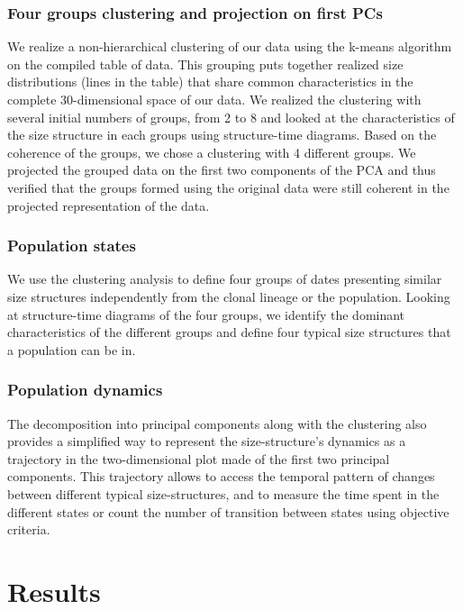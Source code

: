 \subsubsection{Four groups clustering and projection on first PCs}

We realize a non-hierarchical clustering of our data using the
k-means algorithm on the compiled table of data. This grouping puts together
realized size distributions (lines in the table) that share common
characteristics in the complete 30-dimensional space of our data. We realized
the clustering with several initial numbers of groups, from 2 to 8 and looked at
the characteristics of the size structure in each groups using structure-time
diagrams. Based on the coherence of the groups, we chose a clustering with 4
different groups. We projected the grouped data on the first two components of
the PCA and thus verified that the groups formed using the original data were
still coherent in the projected representation of the data.

\subsubsection{Population states}

We use the clustering analysis to define four groups of dates presenting similar
size structures independently from the clonal lineage or the population. Looking
at structure-time diagrams of the four groups, we identify the dominant
characteristics of the different groups and define four typical size structures
that a population can be in.

\subsubsection{Population dynamics}

The decomposition into principal components along with the clustering also
provides a simplified way to represent the size-structure’s dynamics as a
trajectory in the two-dimensional plot made of the first two principal
components. This trajectory allows to access the temporal pattern of changes
between different typical size-structures, and to measure the time spent in the
different states or count the number of transition between states using
objective criteria.

\section{Results}

